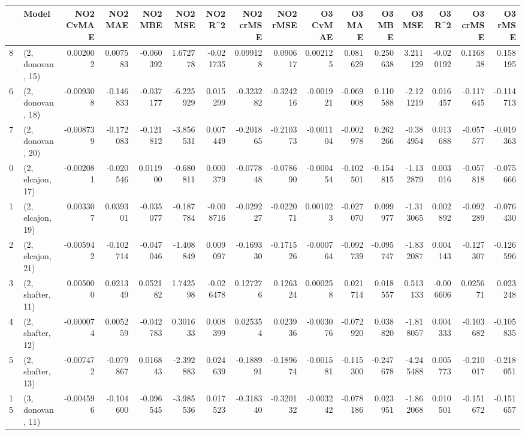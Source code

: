 \begin{tabular}{llrrrrrrrrrrrrrr}
\toprule
{} &             Model &  NO2 CvMAE &   NO2 MAE &   NO2 MBE &    NO2 MSE &   NO2 R\textasciicircum2 &  NO2 crMSE &  NO2 rMSE &  O3 CvMAE &    O3 MAE &    O3 MBE &     O3 MSE &    O3 R\textasciicircum2 &  O3 crMSE &   O3 rMSE \\
\midrule
8  &  (2, donovan, 15) &   0.002002 &  0.007583 & -0.060392 &   1.672778 & -0.021735 &   0.099128 &  0.090617 &  0.002125 &  0.081629 &  0.250638 &   3.211129 & -0.020192 &  0.116838 &  0.158195 \\
6  &  (2, donovan, 18) &  -0.009308 & -0.146833 & -0.037177 &  -6.225929 &  0.015299 &  -0.323282 & -0.324216 & -0.001921 & -0.069008 &  0.110588 &  -2.121219 &  0.016457 & -0.117645 & -0.114713 \\
7  &  (2, donovan, 20) &  -0.008739 & -0.172083 & -0.121812 &  -3.856531 &  0.007449 &  -0.201865 & -0.210373 & -0.001104 & -0.002978 &  0.262266 &  -0.384954 &  0.013688 & -0.057577 & -0.019363 \\
0  &  (2, elcajon, 17) &  -0.002081 & -0.020546 &  0.011900 &  -0.680811 &  0.000379 &  -0.077848 & -0.078690 & -0.000454 & -0.102501 & -0.154815 &  -1.132879 &  0.003016 & -0.057818 & -0.075666 \\
1  &  (2, elcajon, 19) &   0.003307 &  0.039301 & -0.035077 &  -0.187784 & -0.008716 &  -0.029227 & -0.022071 &  0.001023 & -0.027070 &  0.099977 &  -1.313065 &  0.002892 & -0.092289 & -0.076430 \\
2  &  (2, elcajon, 21) &  -0.005942 & -0.102714 & -0.047046 &  -1.408849 &  0.009097 &  -0.169330 & -0.171526 & -0.000764 & -0.092739 & -0.095747 &  -1.832087 &  0.004143 & -0.127307 & -0.126596 \\
3  &  (2, shafter, 11) &   0.005000 &  0.021349 &  0.052182 &   1.742598 & -0.026478 &   0.127276 &  0.126324 &  0.000258 &  0.021714 &  0.018557 &   0.513133 & -0.006606 &  0.025671 &  0.023248 \\
4  &  (2, shafter, 12) &  -0.000074 &  0.005259 & -0.042783 &   0.301633 &  0.008399 &   0.025354 &  0.023936 & -0.003076 & -0.072920 &  0.038820 &  -1.818057 &  0.004333 & -0.103682 & -0.105835 \\
5  &  (2, shafter, 13) &  -0.007472 & -0.079867 &  0.016843 &  -2.392883 &  0.024639 &  -0.188991 & -0.189674 & -0.001581 & -0.115300 & -0.247678 &  -4.245488 &  0.005773 & -0.210017 & -0.218051 \\
15 &  (3, donovan, 11) &  -0.004596 & -0.104600 & -0.096545 &  -3.985536 &  0.017523 &  -0.318340 & -0.320132 & -0.003242 & -0.078186 &  0.023951 &  -1.862068 &  0.010501 & -0.151672 & -0.151657 \\

\end{tabular}
